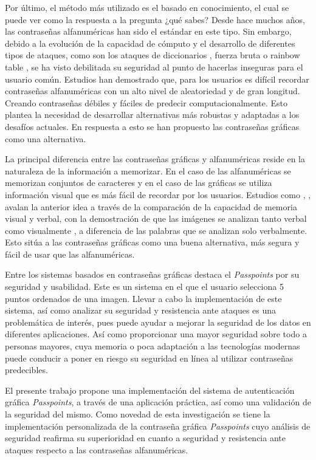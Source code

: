 Por último, el método más utilizado es el basado en conocimiento, el cual se puede ver como la respuesta a la pregunta ¿qué sabes? Desde hace muchos años, las contraseñas alfanuméricas han sido el estándar en este tipo. Sin embargo, debido a la evolución de la capacidad de cómputo y el desarrollo de diferentes tipos de ataques, como son los ataques de diccionarios  \cite{10.1145/1102120.1102168}, fuerza bruta  \cite{Apostol2012BruteforceA} o rainbow table  \cite{wahab2024investigating}, se ha visto debilitada su seguridad al punto de hacerlas inseguras para el usuario común. Estudios han demostrado que, para los usuarios es difícil recordar contraseñas alfanuméricas con un alto nivel de aleatoriedad y de gran longitud. Creando contraseñas débiles y fáciles de predecir computacionalmente. Esto plantea la necesidad de desarrollar alternativas más robustas y adaptadas a los desafíos actuales. En respuesta a esto se han propuesto las contraseñas gráficas como una alternativa.

La principal diferencia entre las contraseñas gráficas y alfanuméricas reside en la naturaleza de la información a memorizar. En el caso de las alfanuméricas se memorizan conjuntos de caracteres y en el caso de las gráficas se utiliza información visual que es más fácil de recordar por los usuarios. Estudios como  \cite{paivio2013imagery},  \cite{shepard1967recognition},  \cite{nelson1976pictorial} avalan la anterior idea a través de la comparación de la capacidad de memoria visual y verbal, con la demostración de que las imágenes se analizan tanto verbal como visualmente  \cite{shepard1967recognition}, a diferencia de las palabras que se analizan solo verbalmente. Esto sitúa a las contraseñas gráficas como una buena alternativa, más segura y fácil de usar que las alfanuméricas.

Entre los sistemas basados en contraseñas gráficas destaca el \textit{Passpoints}  \cite{wiedenbeck2005passpoints} por su seguridad y usabilidad. Este es un sistema en el que el usuario selecciona 5 puntos ordenados de una imagen. Llevar a cabo la implementación de este sistema, así como analizar su seguridad y resistencia ante ataques es una problemática de interés, pues puede ayudar a mejorar la seguridad de los datos en diferentes aplicaciones. Así como proporcionar una mayor seguridad sobre todo a personas mayores, cuya memoria o poca adaptación a las tecnologías modernas puede conducir a poner en riesgo su seguridad en línea al utilizar contraseñas predecibles.

El presente trabajo propone una implementación del sistema de autenticación gráfica \textit{Passpoints}, a través de una aplicación práctica, así como una validación de la seguridad del mismo. Como novedad de esta investigación se tiene la implementación personalizada de la contraseña gráfica \textit{Passpoints} cuyo análisis de seguridad reafirma su superioridad en cuanto a seguridad y resistencia ante ataques respecto a las contraseñas alfanuméricas.



